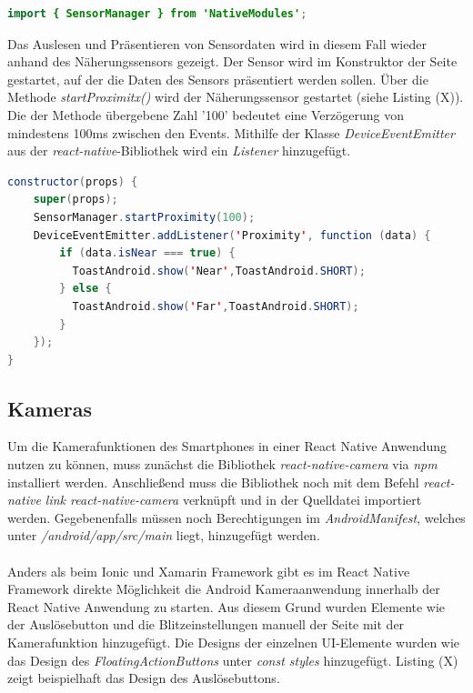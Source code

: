 \begin{lstlisting}[caption=Import der \textit{SensorManager}-Klasse, label=lst:ImportSensorManager, language=Java]
import { SensorManager } from 'NativeModules';
\end{lstlisting}

Das Auslesen und Präsentieren von Sensordaten wird in diesem Fall wieder anhand des Näherungssensors gezeigt. Der Sensor wird im Konstruktor der Seite gestartet, auf der die Daten des Sensors präsentiert werden sollen. Über die Methode \textit{startProximitx()} wird der Näherungssensor gestartet (siehe Listing (X)). Die der Methode übergebene Zahl '100' bedeutet eine Verzögerung von mindestens 100ms zwischen den Events. Mithilfe der Klasse \textit{DeviceEventEmitter} aus der \textit{react-native}-Bibliothek wird ein \textit{Listener} hinzugefügt. 
\clearpage

\begin{lstlisting}[caption=Auslesen und Anzeigen der Daten des Näherungssensors, label=lst:ProximityData, language=Java]
constructor(props) {
    super(props);
    SensorManager.startProximity(100);
    DeviceEventEmitter.addListener('Proximity', function (data) {
        if (data.isNear === true) {
          ToastAndroid.show('Near',ToastAndroid.SHORT);
        } else {
          ToastAndroid.show('Far',ToastAndroid.SHORT);
        }
    });
}
\end{lstlisting}

\subsection*{Kameras}

Um die Kamerafunktionen des Smartphones in einer React Native Anwendung nutzen zu können, muss zunächst die Bibliothek \textit{react-native-camera} via \textit{npm} installiert werden. Anschließend muss die Bibliothek noch mit dem Befehl \textit{react-native link react-native-camera} verknüpft und in der Quelldatei importiert werden. Gegebenenfalls müssen noch Berechtigungen im \textit{AndroidManifest}, welches unter \textit{/android/app/src/main} liegt, hinzugefügt werden. 
\\
\\
Anders als beim Ionic und Xamarin Framework gibt es im React Native Framework direkte Möglichkeit die Android Kameraanwendung innerhalb der React Native Anwendung zu starten. Aus diesem Grund wurden Elemente wie der Auslösebutton und die Blitzeinstellungen manuell der Seite mit der Kamerafunktion hinzugefügt. Die Designs der einzelnen UI-Elemente wurden wie das Design des \textit{FloatingActionButtons} unter \textit{const styles} hinzugefügt. Listing (X) zeigt beispielhaft das Design des Auslösebuttons.

